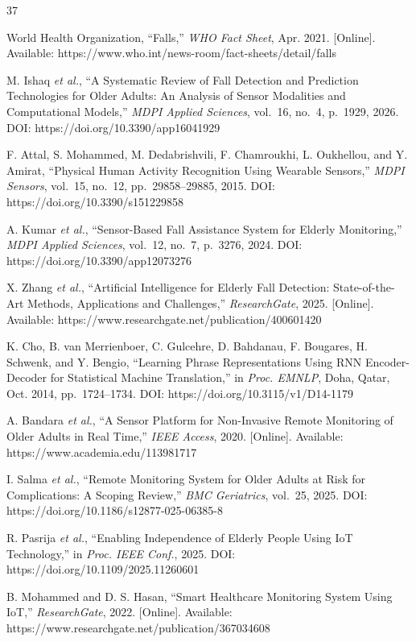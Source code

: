 \documentclass[conference]{IEEEtran}
\begin{document}
\begin{thebibliography}{37}

World Health Organization, ``Falls,'' \textit{WHO Fact Sheet}, Apr. 2021. [Online]. Available: https://www.who.int/news-room/fact-sheets/detail/falls

M. Ishaq \textit{et al.}, ``A Systematic Review of Fall Detection and Prediction Technologies for Older Adults: An Analysis of Sensor Modalities and Computational Models,'' \textit{MDPI Applied Sciences}, vol.~16, no.~4, p.~1929, 2026. DOI: https://doi.org/10.3390/app16041929

F. Attal, S. Mohammed, M. Dedabrishvili, F. Chamroukhi, L. Oukhellou, and Y. Amirat, ``Physical Human Activity Recognition Using Wearable Sensors,'' \textit{MDPI Sensors}, vol.~15, no.~12, pp.~29858--29885, 2015. DOI: https://doi.org/10.3390/s151229858

A. Kumar \textit{et al.}, ``Sensor-Based Fall Assistance System for Elderly Monitoring,'' \textit{MDPI Applied Sciences}, vol.~12, no.~7, p.~3276, 2024. DOI: https://doi.org/10.3390/app12073276

X. Zhang \textit{et al.}, ``Artificial Intelligence for Elderly Fall Detection: State-of-the-Art Methods, Applications and Challenges,'' \textit{ResearchGate}, 2025. [Online]. Available: https://www.researchgate.net/publication/400601420

K. Cho, B. van Merrienboer, C. Gulcehre, D. Bahdanau, F. Bougares, H. Schwenk, and Y. Bengio, ``Learning Phrase Representations Using RNN Encoder-Decoder for Statistical Machine Translation,'' in \textit{Proc. EMNLP}, Doha, Qatar, Oct. 2014, pp.~1724--1734. DOI: https://doi.org/10.3115/v1/D14-1179

A. Bandara \textit{et al.}, ``A Sensor Platform for Non-Invasive Remote Monitoring of Older Adults in Real Time,'' \textit{IEEE Access}, 2020. [Online]. Available: https://www.academia.edu/113981717

I. Salma \textit{et al.}, ``Remote Monitoring System for Older Adults at Risk for Complications: A Scoping Review,'' \textit{BMC Geriatrics}, vol.~25, 2025. DOI: https://doi.org/10.1186/s12877-025-06385-8

R. Pasrija \textit{et al.}, ``Enabling Independence of Elderly People Using IoT Technology,'' in \textit{Proc. IEEE Conf.}, 2025. DOI: https://doi.org/10.1109/2025.11260601

B. Mohammed and D. S. Hasan, ``Smart Healthcare Monitoring System Using IoT,'' \textit{ResearchGate}, 2022. [Online]. Available: https://www.researchgate.net/publication/367034608


\end{thebibliography}
\end{document}
